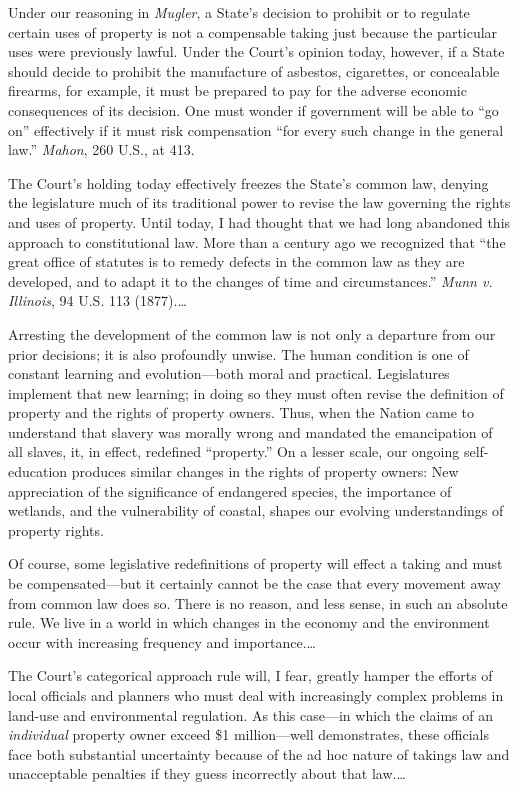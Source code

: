 Under our reasoning in \textit{Mugler}, a State's decision to prohibit or to
regulate certain uses of property is not a compensable taking just because the
particular uses were previously lawful. Under the Court's opinion today,
however, if a State should decide to prohibit the manufacture of asbestos,
cigarettes, or concealable firearms, for example, it must be prepared to pay for
the adverse economic consequences of its decision. One must wonder if government
will be able to ``go on'' effectively if it must risk compensation ``for every
such change in the general law.'' \textit{Mahon}, 260 U.S., at 413.

The Court's holding today effectively freezes the State's common law, denying
the legislature much of its traditional power to revise the law governing the
rights and uses of property. Until today, I had thought that we had long
abandoned this approach to constitutional law. More than a century ago we
recognized that ``the great office of statutes is to remedy defects in the
common law as they are developed, and to adapt it to the changes of time and
circumstances.'' \textit{Munn v. Illinois}, 94 U.S. 113 (1877).\ldots

Arresting the development of the common law is not only a departure from our
prior decisions; it is also profoundly unwise. The human condition is one of
constant learning and evolution---both moral and practical. Legislatures
implement that new learning; in doing so they must often revise the definition
of property and the rights of property owners. Thus, when the Nation came to
understand that slavery was morally wrong and mandated the emancipation of all
slaves, it, in effect, redefined ``property.'' On a lesser scale, our ongoing
self-education produces similar changes in the rights of property owners: New
appreciation of the significance of endangered species, the importance of
wetlands, and the vulnerability of coastal, shapes our evolving understandings
of property rights.

Of course, some legislative redefinitions of property will effect a taking and
must be compensated---but it certainly cannot be the case that every movement
away from common law does so. There is no reason, and less sense, in such an
absolute rule. We live in a world in which changes in the economy and the
environment occur with increasing frequency and importance.\ldots

The Court's categorical approach rule will, I fear, greatly hamper the efforts
of local officials and planners who must deal with increasingly complex problems
in land-use and environmental regulation. As this case---in which the claims of
an \textit{individual} property owner exceed \$1 million---well demonstrates,
these officials face both substantial uncertainty because of the ad hoc nature
of takings law and unacceptable penalties if they guess incorrectly about that
law.\ldots

